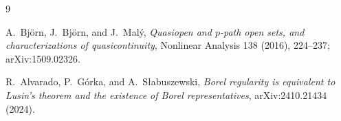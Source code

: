 \documentclass[11pt]{amsart}
\theoremstyle{definition}
\begin{document}
\begin{thebibliography}{9}

A.~Bj\"orn, J.~Bj\"orn, and J.~Mal\'y,
\emph{Quasiopen and $p$-path open sets, and characterizations of
quasicontinuity},
Nonlinear Analysis 138 (2016), 224--237; arXiv:1509.02326.

R.~Alvarado, P.~G\'orka, and A.~S\l abuszewski,
\emph{Borel regularity is equivalent to Lusin's theorem and the existence of
Borel representatives},
arXiv:2410.21434 (2024).

\end{thebibliography}
\end{document}

